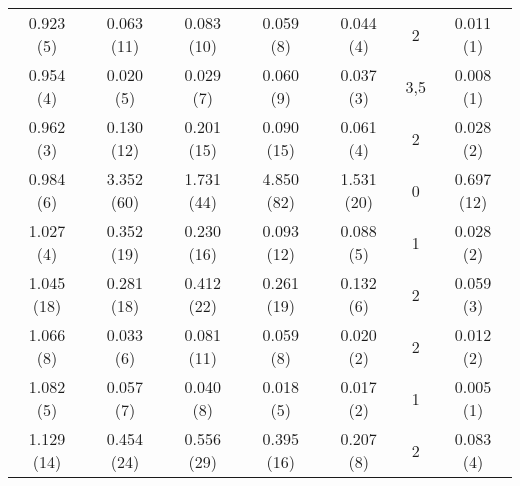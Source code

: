 \begin{table}
\begin{tabular}{c c c c c c c}
0.923 (5) & 0.063 (11) & 0.083 (10) & 0.059 (8) & 0.044 (4) & 2 & 0.011 (1) \\
0.954 (4) & 0.020 (5) & 0.029 (7) & 0.060 (9) & 0.037 (3) & 3,5 & 0.008 (1) \\
0.962 (3) & 0.130 (12) & 0.201 (15) & 0.090 (15) & 0.061 (4) & 2 & 0.028 (2) \\
0.984 (6) & 3.352 (60) & 1.731 (44) & 4.850 (82) & 1.531 (20) & 0 & 0.697 (12) \\
1.027 (4) & 0.352 (19) & 0.230 (16) & 0.093 (12) & 0.088 (5) & 1 & 0.028 (2) \\
1.045 (18) & 0.281 (18) & 0.412 (22) & 0.261 (19) & 0.132 (6) & 2 & 0.059 (3) \\
1.066 (8) & 0.033 (6) & 0.081 (11) & 0.059 (8) & 0.020 (2) & 2 & 0.012 (2) \\
1.082 (5) & 0.057 (7) & 0.040 (8) & 0.018 (5) & 0.017 (2) & 1 & 0.005 (1) \\
1.129 (14) & 0.454 (24) & 0.556 (29) & 0.395 (16) & 0.207 (8) & 2 & 0.083 (4) \\
\hline \hline
\end{tabular}
\label{Nd1}
\end{table}

